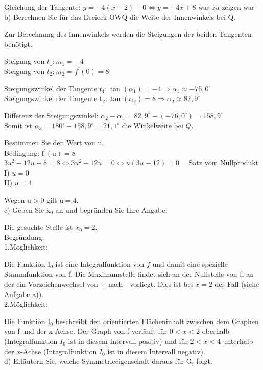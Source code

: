 \documentclass[10pt]{article}
\begin{document}
Gleichung der Tangente: $y=-4(x-2)+0 \Leftrightarrow y=-4 x+8$ was $z u$ zeigen war\\
b) Berechnen Sie für das Dreieck OWQ die Weite des Innenwinkels bei Q.

Zur Berechnung des Innenwinkels werden die Steigungen der beiden Tangenten benötigt.

Steigung von $t_{1}: m_{1}=-4$\\
Steigung von $t_{2}: m_{2}=f^{\prime}(0)=8$

Steigungswinkel der Tangente $t_{1}: \tan \left(\alpha_{1}\right)=-4 \Rightarrow \alpha_{1} \approx-76,0^{\circ}$\\
Steigungswinkel der Tangente $\mathrm{t}_{2}: \tan \left(\alpha_{2}\right)=8 \Rightarrow \alpha_{2} \approx 82,9^{\circ}$

Differenz der Steigungswinkel: $\alpha_{2}-\alpha_{1}=82,9^{\circ}-\left(-76,0^{\circ}\right)=158,9^{\circ}$\\
Somit ist $\alpha_{3}=180^{\circ}-158,9^{\circ}=21,1^{\circ}$ die Winkelweite bei $Q$.

Bestimmen Sie den Wert von u.\\
Bedingung: $\mathrm{f}^{\prime}(\mathrm{u})=8$\\
$3 u^{2}-12 u+8=8 \Leftrightarrow 3 u^{2}-12 u=0 \Leftrightarrow u(3 u-12)=0 \quad$ Satz vom Nullprodukt\\
I) $u=0$\\
II) $u=4$

Wegen $\mathrm{u}>0$ gilt $\mathrm{u}=4$.\\
c) Geben Sie $\mathrm{x}_{0}$ an und begründen Sie Ihre Angabe.

Die gesuchte Stelle ist $x_{0}=2$.\\
Begründung:\\
1.Möglichkeit:

Die Funktion $\mathrm{I}_{0}$ ist eine Integralfunktion von $f$ und damit eine spezielle\\
Stammfunktion von f. Die Maximumstelle findet sich an der Nullstelle von f, an der ein Vorzeichenwechsel von + nach - vorliegt. Dies ist bei $x=2$ der Fall (siehe Aufgabe a)).\\
2.Möglichkeit:

Die Funktion $\mathrm{I}_{0}$ beschreibt den orientierten Flächeninhalt zwischen dem Graphen von f und der x-Achse. Der Graph von f verläuft für $0<x<2$ oberhalb (Integralfunktion $I_{0}$ ist in diesem Intervall positiv) und für $2<x<4$ unterhalb der $x$-Achse (Integralfunktion $I_{0}$ ist in diesem Intervall negativ).\\
d) Erläutern Sie, welche Symmetrieeigenschaft daraus für $\mathrm{G}_{\mathrm{f}}$ folgt.
\end{document}
